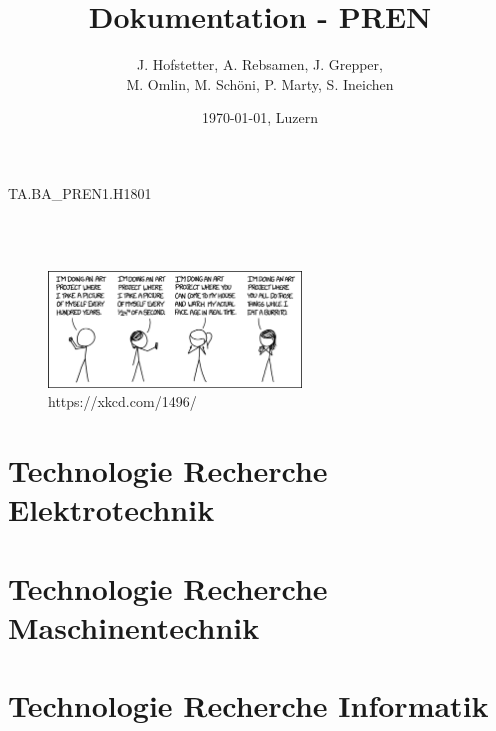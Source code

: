 \documentclass[11pt]{scrartcl}
\title{Dokumentation - PREN}
\author{J. Hofstetter,  A. Rebsamen, J. Grepper, \\ M. Omlin, M. Schöni, P. Marty, S. Ineichen}
\date{\today{}, Luzern}
\begin{document}
    
        \begin{titlingpage}
            \begin{center}
                \begin{Huge} %
                    TA.BA{\_}PREN1.H1801 \\
                    \textbf{\thetitle} \\
                \end{Huge}
                \vspace{0.5cm}
                \begin{huge} %
                    \theauthor \\
                \end{huge}
                \vspace{0.5cm}
                \vspace{1cm}
                \begin{figure}[H] %
                    \centering
                    \includegraphics[width=0.6\textwidth]{images/comic.png}
                    \caption {https://xkcd.com/1496/}
                \end{figure}
                \vspace{0.5cm}
                \begin{huge} %
                    \thedate
                \end{huge}
            \end{center}
        \end{titlingpage}
        
        \tableofcontents
        \clearpage
        
        \section{Technologie Recherche Elektrotechnik}
        
        \clearpage
        
        \section{Technologie Recherche Maschinentechnik}
        
        \clearpage
        
        \section{Technologie Recherche Informatik}
        
        \clearpage
        
    
\end{document}

